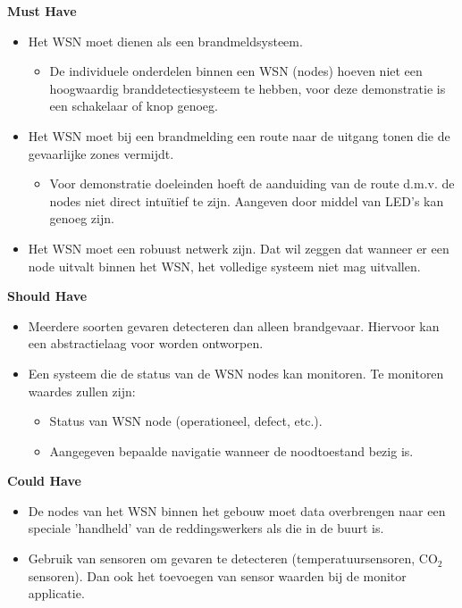 \documentclass{../local}
\begin{document}
\noindent\textbf{Must Have}
\begin{itemize}
\item Het WSN moet dienen als een brandmeldsysteem.
\begin{itemize}
\item De individuele onderdelen binnen een WSN (nodes) hoeven niet een hoogwaardig branddetectiesysteem te hebben, voor deze demonstratie is een schakelaar of knop genoeg.
\end{itemize}
\item Het WSN moet bij een brandmelding een route naar de uitgang tonen die de gevaarlijke zones vermijdt.
\begin{itemize}
\item Voor demonstratie doeleinden hoeft de aanduiding van de route d.m.v. de nodes niet direct intuïtief te zijn. Aangeven door middel van LED's kan genoeg zijn.
\end{itemize}
\item Het WSN moet een robuust netwerk zijn. Dat wil zeggen dat wanneer er een node uitvalt binnen het WSN, het volledige systeem niet mag uitvallen.
\end{itemize}

\noindent\textbf{Should Have}
\begin{itemize}
\item Meerdere soorten gevaren detecteren dan alleen brandgevaar. Hiervoor kan een abstractielaag voor worden ontworpen.
\item Een systeem die de status van de WSN nodes kan monitoren. Te monitoren waardes zullen zijn:
\begin{itemize}
\item Status van WSN node (operationeel, defect, etc.).
\item Aangegeven bepaalde navigatie wanneer de noodtoestand bezig is.
\end{itemize}
\end{itemize}

\noindent\textbf{Could Have}
\begin{itemize}
\item De nodes van het WSN binnen het gebouw moet data overbrengen naar een speciale 'handheld' van de reddingswerkers als die in de buurt is.
\item Gebruik van sensoren om gevaren te detecteren (temperatuursensoren, CO$_{2}$ sensoren). Dan ook het toevoegen van sensor waarden bij de monitor applicatie.
\end{itemize}
\end{document}
